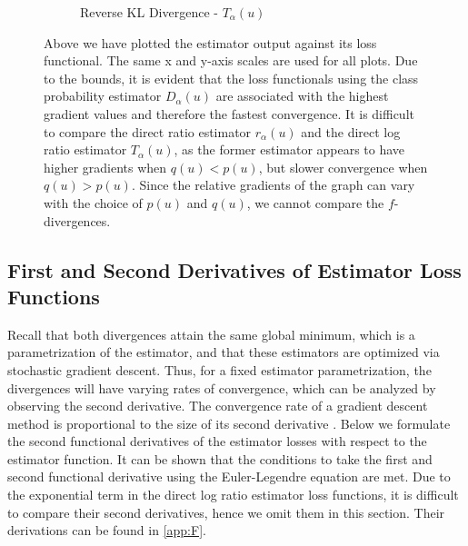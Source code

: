 \documentclass[honours,12pt]{unswthesis}
\numberwithin{equation}{section}
\theoremstyle{definition}
\begin{document}
\begin{figure}[h!]
\begin{subfigure}{0.49\textwidth}
\caption{Reverse KL Divergence - $T_\alpha(u)$}
\end{subfigure}
\caption{\small Above we have plotted the estimator output against its loss functional. The same x and y-axis scales are used for all plots. Due to the bounds, it is evident that the loss functionals using the class probability estimator $D_\alpha(u)$ are associated with the highest gradient values and therefore the fastest convergence. It is difficult to compare the direct ratio estimator $r_\alpha(u)$ and the direct log ratio estimator $T_\alpha(u)$, as the former estimator appears to have higher gradients when $q(u)<p(u)$, but slower convergence when $q(u)>p(u)$. Since the relative gradients of the graph can vary with the choice of $p(u)$ and $q(u)$, we cannot compare the $f$-divergences.}
\label{fig:7.1}
\end{figure}
\subsection{First and Second Derivatives of Estimator Loss Functions}
Recall that both divergences attain the same global minimum, which is a parametrization of the estimator, and that these estimators are optimized via stochastic gradient descent. Thus, for a fixed estimator parametrization, the divergences will have varying rates of convergence, which can be analyzed by observing the second derivative. The convergence rate of a gradient descent method is proportional to the size of its second derivative \citep{lecun}. Below we formulate the second functional derivatives of the estimator losses with respect to the estimator function. It can be shown that the conditions to take the first and second functional derivative using the Euler-Legendre equation are met. Due to the exponential term in the direct log ratio estimator loss functions, it is difficult to compare their second derivatives, hence we omit them in this section. Their derivations can be found in \autoref{app:F}. 
\end{document}
